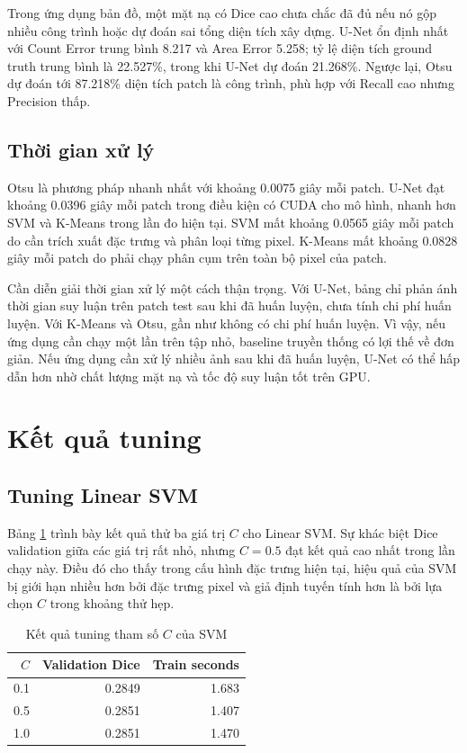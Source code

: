 \documentclass[12pt,a4paper]{report}
\begin{document}
Trong ứng dụng bản đồ, một mặt nạ có Dice cao chưa chắc đã đủ nếu nó gộp nhiều công trình hoặc dự đoán sai tổng diện tích xây dựng. U-Net ổn định nhất với Count Error trung bình 8.217 và Area Error 5.258; tỷ lệ diện tích ground truth trung bình là 22.527\%, trong khi U-Net dự đoán 21.268\%. Ngược lại, Otsu dự đoán tới 87.218\% diện tích patch là công trình, phù hợp với Recall cao nhưng Precision thấp.

\subsection{Thời gian xử lý}

Otsu là phương pháp nhanh nhất với khoảng 0.0075 giây mỗi patch. U-Net đạt khoảng 0.0396 giây mỗi patch trong điều kiện có CUDA cho mô hình, nhanh hơn SVM và K-Means trong lần đo hiện tại. SVM mất khoảng 0.0565 giây mỗi patch do cần trích xuất đặc trưng và phân loại từng pixel. K-Means mất khoảng 0.0828 giây mỗi patch do phải chạy phân cụm trên toàn bộ pixel của patch.

Cần diễn giải thời gian xử lý một cách thận trọng. Với U-Net, bảng chỉ phản ánh thời gian suy luận trên patch test sau khi đã huấn luyện, chưa tính chi phí huấn luyện. Với K-Means và Otsu, gần như không có chi phí huấn luyện. Vì vậy, nếu ứng dụng cần chạy một lần trên tập nhỏ, baseline truyền thống có lợi thế về đơn giản. Nếu ứng dụng cần xử lý nhiều ảnh sau khi đã huấn luyện, U-Net có thể hấp dẫn hơn nhờ chất lượng mặt nạ và tốc độ suy luận tốt trên GPU.

\section{Kết quả tuning}

\subsection{Tuning Linear SVM}

Bảng \ref{tab:svm-tuning} trình bày kết quả thử ba giá trị $C$ cho Linear SVM. Sự khác biệt Dice validation giữa các giá trị rất nhỏ, nhưng $C=0.5$ đạt kết quả cao nhất trong lần chạy này. Điều đó cho thấy trong cấu hình đặc trưng hiện tại, hiệu quả của SVM bị giới hạn nhiều hơn bởi đặc trưng pixel và giả định tuyến tính hơn là bởi lựa chọn $C$ trong khoảng thử hẹp.

\begin{table}[htbp]
\centering
\caption{Kết quả tuning tham số $C$ của SVM}
\label{tab:svm-tuning}
\begin{tabular}{|r|r|r|}
\hline
\textbf{$C$} & \textbf{Validation Dice} & \textbf{Train seconds}\\
\hline
0.1 & 0.2849 & 1.683\\
\hline
0.5 & 0.2851 & 1.407\\
\hline
1.0 & 0.2851 & 1.470\\
\hline
\end{tabular}
\end{table}
\end{document}
